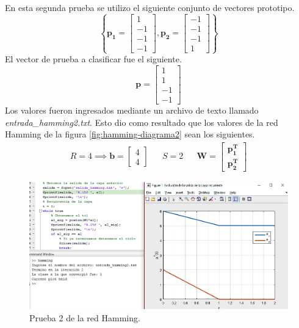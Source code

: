\documentclass[12pt, titlepage]{article}
\begin{document}
       En esta segunda prueba se utilizo el siguiente conjunto de vectores prototipo.
       \[ \left\lbrace \boldsymbol{p_1} = \left[\begin{array}{c}1\\ -1\\ -1 \\ -1 \end{array}\right], \boldsymbol{p_2} = \left[\begin{array}{c}-1\\ -1\\ -1 \\ 1 \end{array}\right] \right\rbrace \]
       El vector de prueba a clasificar fue el siguiente.
       \[ \boldsymbol{p} = \left[\begin{array}{c}1\\ 1\\ -1 \\ -1\end{array}\right] \]
       Los valores fueron ingresados mediante un archivo de texto llamado \emph{entrada\_hamming2.txt}. Esto dio como resultado que los valores de la red Hamming de la figura \ref{fig:hamming-diagrama2} sean los siguientes.
       \begin{align*}
       R = 4 \implies \boldsymbol{b} = \left[\begin{array}{c}4 \\4\end{array}\right] && S = 2 && \boldsymbol{W} = \left[\begin{array}{c}\boldsymbol{p^{T}_1}\\ \boldsymbol{p^{T}_2}\end{array}\right]
       \end{align*}
            \begin{figure}[H]
                \begin{center}
                    \includegraphics[width=16cm]{img/hamming/hamming2.png}
                    \caption{Prueba 2 de la red Hamming.}
                    \label{fig:hamming2}
                \end{center}
            \end{figure}
\end{document}
